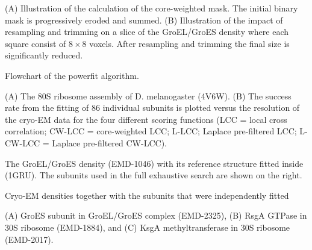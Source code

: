\caption{}{(A) Illustration of the calculation of the core-weighted mask. The
initial binary mask is progressively eroded and summed. (B) Illustration of the
impact of resampling and trimming on a slice of the GroEL/GroES density where
each square consist of $8\times8$ voxels. After resampling and trimming the
final size is significantly reduced.}
\stopbuffer


\caption{Flowchart of the powerfit algorithm.}{}
\stopbuffer


\caption{}{(A) The 80S ribosome assembly of D. melanogaster (4V6W). (B) The
success rate from the fitting of 86 individual subunits is plotted versus the
resolution of the cryo-EM data for the four different scoring functions (LCC =
local cross correlation; CW-LCC = core-weighted LCC; L-LCC; Laplace
pre-filtered LCC; L-CW-LCC = Laplace pre-filtered CW-LCC).} 
\stopbuffer


\caption{}{The GroEL/GroES density (EMD-1046) with its reference structure
fitted inside (1GRU). The subunits used in the full exhaustive search are shown
on the right.}
\stopbuffer


\caption{Cryo-EM densities together with the subunits that were independently
fitted}
{(A) GroES subunit in GroEL/GroES complex (EMD-2325), (B) RsgA GTPase in 30S
ribosome (EMD-1884), and (C) KsgA methyltransferase in 30S ribosome
(EMD-2017).}
\stopbuffer

